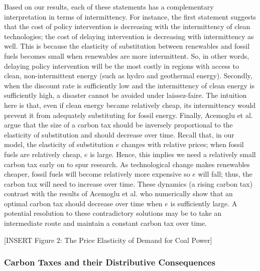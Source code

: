 \documentclass[11pt,a4paper,leqno]{extarticle}
\begin{document}
	Based on our results, each of these statements has a complementary interpretation in terms of intermittency. For instance, the first statement suggests that the cost of policy intervention is decreasing with the intermittency of clean technologies; the cost of delaying intervention is decreasing with intermittency as well. This is because the elasticity of substitution between renewables and fossil fuels becomes small when renewables are more intermittent.  So, in other words, delaying policy intervention will be the most costly in regions with access to clean, non-intermittent energy (such as hydro and geothermal energy). Secondly,  when the discount rate is sufficiently low and the intermittency of clean energy is sufficiently high, a disaster cannot be avoided under laissez-faire. The intuition here is that, even if clean energy became relatively cheap, its intermittency would prevent it from adequately substituting for fossil energy. Finally, Acemoglu et al. argue that the size of a carbon tax should be inversely proportional to the elasticity of substitution and should decrease over time. Recall that, in our model, the elasticity of substitution $e$ changes with relative prices; when fossil fuels are relatively cheap, $e$ is large. Hence, this implies we need a relatively small carbon tax early on to spur research. As technological change makes renewables cheaper, fossil fuels will become relatively more expensive so $e$ will fall; thus, the carbon tax will need to increase over time. These dynamics (a rising carbon tax) contrast with the results of Acemoglu et al. who numerically show that an optimal carbon tax should decrease over time when $e$ is sufficiently large. A potential resolution to these contradictory solutions may be to take an intermediate route and maintain a constant carbon tax over time. 
	
	
	\vspace{0.15in}
	\begin{center}
		[INSERT Figure 2: The Price Elasticity of Demand for Coal Power]
	\end{center}
	\vspace{0.15in}
	

	
	
	\subsubsection{Carbon Taxes and their Distributive Consequences}
	
\end{document}
